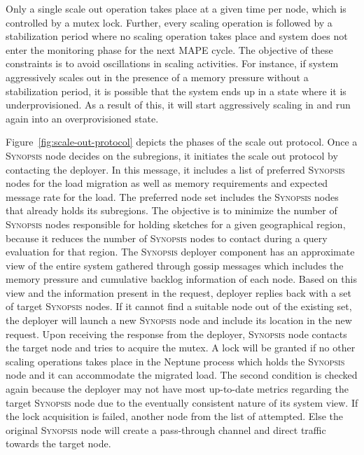 Only a single scale out operation takes place at a given time per node, which is controlled by a mutex lock.
Further, every scaling operation is followed by a stabilization period where no scaling operation takes place and system does not enter the monitoring phase for the next MAPE cycle.
The objective of these constraints is to avoid oscillations in scaling activities.
For instance, if system aggressively scales out in the presence of a memory pressure without a stabilization period, it is possible that the system ends up in a state where it is underprovisioned. As a result of this, it will start aggressively scaling in and run again into an overprovisioned state.

Figure~\ref{fig:scale-out-protocol} depicts the phases of the scale out protocol.
Once a \textsc{Synopsis} node decides on the subregions, it initiates the scale out protocol by contacting the deployer.
In this message, it includes a list of preferred \textsc{Synopsis} nodes for the load migration as well as memory requirements and expected message rate for the load.
The preferred node set includes the \textsc{Synopsis} nodes that already holds its subregions.
The objective is to minimize the number of \textsc{Synopsis} nodes responsible for holding sketches for a given geographical region, because it reduces the number of \textsc{Synopsis} nodes to contact during a query evaluation for that region.
The \textsc{Synopsis} deployer component has an approximate view of the entire system gathered through gossip messages which includes the memory pressure and cumulative backlog information of each node.
Based on this view and the information present in the request, deployer replies back with a set of target \textsc{Synopsis} nodes.
If it cannot find a suitable node out of the existing set, the deployer will launch a new \textsc{Synopsis} node and include its location in the new request.
Upon receiving the response from the deployer, \textsc{Synopsis} node contacts the target node and tries to acquire the mutex.
A lock will be granted if no other scaling operations takes place in the Neptune process which holds the \textsc{Synopsis} node and it can accommodate the migrated load.
The second condition is checked again because the deployer may not have most up-to-date metrics regarding the target \textsc{Synopsis} node due to the eventually consistent nature of its system view.
If the lock acquisition is failed, another node from the list of attempted.
Else the original \textsc{Synopsis} node will create a pass-through channel and direct traffic towards the target node.
